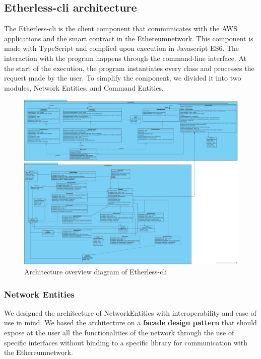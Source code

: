 \subsection{Etherless-cli architecture}
The Etherless-cli is the client component that communicates with the AWS applications and the smart contract in the Ethereum\glo network.
This component is made with TypeScript and complied upon execution in Javascript ES6.
The interaction with the program happens through the command-line interface.
At the start of the execution, the program instantiates every class and processes the request made by the user.
To simplify the component, we divided it into two modules, Network Entities, and Command Entities.

\begin{figure}[h]
	\centering
	\includegraphics[width=\textwidth]{./res/img/Etherless-cli.jpg}
	\caption{Architecture overview diagram of Etherless-cli}
\end{figure}

\subsubsection{Network Entities}
We designed the architecture of NetworkEntities with interoperability and ease of use in mind.
We based the architecture on a \textbf{facade design pattern} that should expose at the user all the functionalities
of the network through the use of specific interfaces without binding to a specific library for communication
with the Ethereum\glo network.
